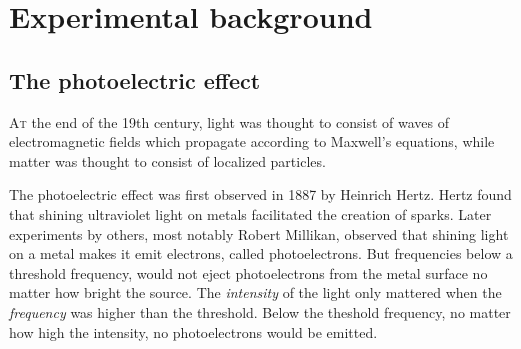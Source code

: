\documentclass{Textbook}
\begin{document}
\chapter{Experimental background}
\section{The photoelectric effect}
\lettrine[lines=3,slope=6pt,nindent=6pt]{\initfamily A}{t} the end of the 19th century, light was thought to consist of waves of electromagnetic fields which propagate according to Maxwell's equations, while matter was thought to consist of localized particles.

The photoelectric effect was first observed in 1887 by Heinrich Hertz. Hertz found that shining ultraviolet light on metals facilitated the creation of sparks. Later experiments by others, most notably Robert Millikan, observed that shining light on a metal makes it emit electrons, called photoelectrons. But frequencies below a threshold frequency, would not eject photoelectrons from the metal surface no matter how bright the source. The \emph{intensity} of the light only mattered when the \emph{frequency} was higher than the threshold. Below the theshold frequency, no matter how high the intensity, no photoelectrons would be emitted. 
\end{document}
